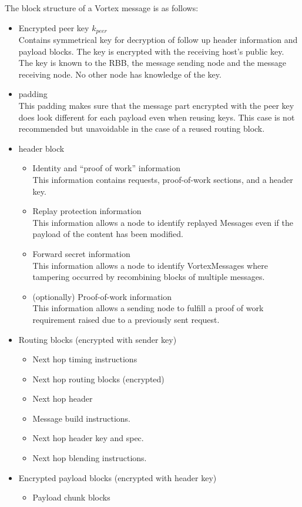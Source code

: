 \documentclass[10pt,journal,compsoc]{IEEEtran}
\begin{document}
The block structure of a Vortex message is as follows:
\begin{itemize}
	\item Encrypted peer key $k_{peer}$\\
          Contains symmetrical key for decryption of follow up header information and payload blocks. The key is encrypted with the receiving host's public key. The key is known to the RBB, the message sending node and the message receiving node. No other node has knowledge of the key.
	\item padding\\
	      This padding makes sure that the message part encrypted with the peer key does look different for each payload even when reusing keys. This case is not recommended but unavoidable in the case of a reused routing block. 
	\item header block
	\begin{itemize}
		\item Identity and ``proof of work'' information\\
		      This information contains requests, proof-of-work sections, and a header key.
		\item Replay protection information\\
		      This information allows a node to identify replayed Messages even if the payload of the content has been modified.
		\item Forward secret information\\
		      This information allows a node to identify VortexMessages where tampering occurred by recombining blocks of multiple messages.      
		\item (optionally) Proof-of-work information\\
              This information allows a sending node to fulfill a proof of work requirement raised due to a previously sent request.      
	\end{itemize}
	\item Routing blocks (encrypted with sender key)
	\begin{itemize}
		\item Next hop timing instructions
		\item Next hop routing blocks (encrypted)
		\item Next hop header
		\item Message build instructions.
		\item Next hop header key and spec.
		\item Next hop blending instructions.
	\end{itemize}
	\item Encrypted payload blocks (encrypted with header key)
	\begin{itemize}
		\item Payload chunk blocks
	\end{itemize}
\end{itemize}
\end{document}
